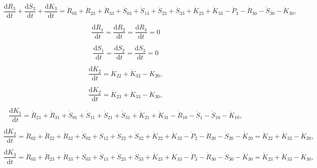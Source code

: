  \begin{equation} \label{eq:C-CV_R_dot_3}
 	\frac{\mathrm{d}R_{3}}{\mathrm{d}t} 
	+ \frac{\mathrm{d}S_{3}}{\mathrm{d}t}
 	+ \frac{\mathrm{d}K_{3}}{\mathrm{d}t}
 	=  \dot{R}_{03} + \dot{R}_{23} + \dot{R}_{33}
 	+ \dot{S}_{03} + \dot{S}_{13} + \dot{S}_{23} + \dot{S}_{33} 
 	+ \dot{K}_{23} + \dot{K}_{33}
 	- \dot{P}_{3}
 	- \dot{R}_{30} 
 	- \dot{S}_{30} 
 	- \dot{K}_{30},
 \end{equation}

\begin{equation}\label{eq:C-dR_dt_zero}
	\frac{\mathrm{d}R_{1}}{\mathrm{d}t} = \frac{\mathrm{d}R_{2}}{\mathrm{d}t} = \frac{\mathrm{d}R_{3}}{\mathrm{d}t} = 0
\end{equation}

\begin{equation}\label{eq:C-dS_dt_zero}
	\frac{\mathrm{d}S_{1}}{\mathrm{d}t} = \frac{\mathrm{d}S_{2}}{\mathrm{d}t} = \frac{\mathrm{d}S_{3}}{\mathrm{d}t} = 0
\end{equation}

\begin{equation} \label{eq:C-CV_K_dot_2}
	\frac{\mathrm{d}K_{2}}{\mathrm{d}t}
	=  \dot{K}_{22} + \dot{K}_{32} 
	- \dot{K}_{20},
\end{equation}

\begin{equation} \label{eq:C-CV_K_dot_3}
	\frac{\mathrm{d}K_{2}}{\mathrm{d}t}
	=  \dot{K}_{23} + \dot{K}_{33} 
	- \dot{K}_{30},
\end{equation}

 \begin{equation} \label{eq:C-CV_R_dot_1b}
 	\frac{\mathrm{d}K_{1}}{\mathrm{d}t}
 	=  \dot{R}_{21} + \dot{R}_{31}
 	+ \dot{S}_{01} + \dot{S}_{11} 
	+ \dot{S}_{21} + \dot{S}_{31}
 	+ \dot{K}_{21} + \dot{K}_{31}
 	- \dot{R}_{10} 
 	- \dot{S}_{1} - \dot{S}_{10} 
 	- \dot{K}_{10},
 \end{equation}
 
 \begin{equation} \label{eq:C-CV_R_dot_2b}
 	\frac{\mathrm{d}K_{2}}{\mathrm{d}t}
 	=  \dot{R}_{02} + \dot{R}_{22} + \dot{R}_{32}
 	+ \dot{S}_{02} + \dot{S}_{12} + \dot{S}_{22} + \dot{S}_{32} 
 	+ \dot{K}_{22} + \dot{K}_{32}
 	- \dot{P}_{2}
 	- \dot{R}_{20} 
 	- \dot{S}_{20} 
 	- \dot{K}_{20}
	=  \dot{K}_{22} + \dot{K}_{32} 
	- \dot{K}_{20},
 \end{equation}
 
 \begin{equation} \label{eq:C-CV_R_dot_3}
 	\frac{\mathrm{d}K_{3}}{\mathrm{d}t}
 	=  \dot{R}_{03} + \dot{R}_{23} + \dot{R}_{33}
 	+ \dot{S}_{03} + \dot{S}_{13} + \dot{S}_{23} + \dot{S}_{33} 
 	+ \dot{K}_{23} + \dot{K}_{33}
 	- \dot{P}_{3}
 	- \dot{R}_{30} 
 	- \dot{S}_{30} 
 	- \dot{K}_{30}
	=  \dot{K}_{23} + \dot{K}_{33} 
	- \dot{K}_{30},
 \end{equation}


